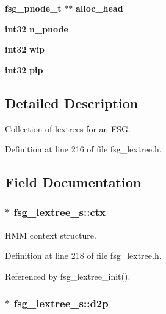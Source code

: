 \begin{DoxyCompactItemize}
\item 
{\bf fsg\-\_\-pnode\-\_\-t} $\ast$$\ast$ {\bfseries alloc\-\_\-head}\label{structfsg__lextree__s_a430605e77e2ad3de2b5e2aa1fb7eb365}

\item 
{\bf int32} {\bfseries n\-\_\-pnode}\label{structfsg__lextree__s_ac55755e9f9453acab71a23a5cf3ea542}

\item 
{\bf int32} {\bfseries wip}\label{structfsg__lextree__s_a791fcaf2440b7d90796c5e7e50a7b186}

\item 
{\bf int32} {\bfseries pip}\label{structfsg__lextree__s_a9e6768eff7003453759b1ade9cb50bc7}

\end{DoxyCompactItemize}


\subsection{\-Detailed \-Description}
\-Collection of lextrees for an \-F\-S\-G. 

\-Definition at line 216 of file fsg\-\_\-lextree.\-h.



\subsection{\-Field \-Documentation}
\subsubsection[{ctx}]{$\ast$ {\bf fsg\-\_\-lextree\-\_\-s\-::ctx}}\label{structfsg__lextree__s_afbbd5d59a74dfb287289aa20a9a3979a}


\-H\-M\-M context structure. 



\-Definition at line 218 of file fsg\-\_\-lextree.\-h.



\-Referenced by fsg\-\_\-lextree\-\_\-init().

\subsubsection[{d2p}]{$\ast$ {\bf fsg\-\_\-lextree\-\_\-s\-::d2p}}\label{structfsg__lextree__s_add12fb7151ebdecb74deaf6aca86d95e}



